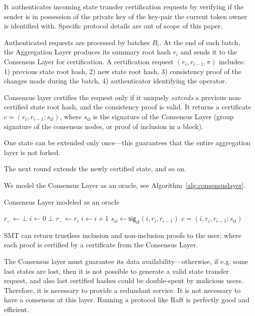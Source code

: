 \documentclass[twocolumn]{article}
\begin{document}
It authenticates incoming state transfer certification requests by verifying if the sender is in possession of the private key of the key-pair the current token owner is identified with. Specific protocol details are out of scope of this paper.

Authenticated requests are processed by batches $B_i$. At the end of each batch, the Aggregation Layer produces its summary root hash $r_i$ and sends it to the Consensus Layer for certification. A certification request $(r_i, r_{i-1}, \pi)$ includes: 1) previous state root hash, 2) new state root hash, 3) consistency proof of the changes made during the batch, 4) authenticator identifying the operator.

Consensus layer certifies the request only if it uniquely \textit{extends} a previous non-certified state root hash, and the consistency proof is valid. It returns a certificate $c = (r_i, r_{i-1}; s_{\textsf{cl}})$, where $s_{\textsf{cl}}$ is the signature of the Consensus Layer (group signature of the consensus nodes, or proof of inclusion in a block).

One state can be extended only once---this guarantees that the entire aggregation layer is not forked.

The next round extends the newly certified state, and so on.

We model the Consensus Layer as an oracle, see Algorithm~\ref{alg:consensuslayer}.

\begin{algorithm}[tb]
  \caption{Consensus Layer modeled as an oracle}\label{alg:consensuslayer}
  \begin{algorithmic}[0]
        \State $r_- \gets \bot$
        \State $i \gets 0$
    \EndFunction
            \State \Return $\bot$
        \EndIf
        \State $r_- \gets r_i$
        \State $i \gets i+1$
        \State $s_{\textsf{cl}} \gets \textsf{sig}_\textsf{cl}(i, r_i, r_{i-1})$
        \State \Return $c = (i, r_i, r_{i-1}; s_{\textsf{cl}})$
    \EndFunction
  \end{algorithmic}
\end{algorithm}


SMT can return trustless inclusion and non-inclusion proofs to the user; where each proof is certified by a certificate from the Consensus Layer.

The Consensus layer must guarantee its data availability---otherwise, if e.g. some last states are lost, then it is not possible to generate a valid state transfer request, and also last certified hashes could be double-spent by malicious users. Therefore, it is necessary to provide a redundant service. It is not necessary to have a consensus at this layer. Running a protocol like Raft is perfectly good and efficient.
\end{document}
